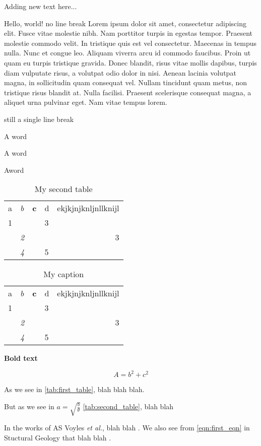 \documentclass[10pt,a4paper]{article}
\begin{document}
Adding new text here...

Hello, world!
no line break
Lorem ipsum dolor sit amet, consectetur adipiscing elit. Fusce vitae molestie nibh. Nam porttitor turpis in egestas tempor. Praesent molestie commodo velit. In tristique quis est vel consectetur. Maecenas in tempus \\nulla. Nunc et congue leo. Aliquam viverra arcu id commodo faucibus. Proin ut quam eu turpis tristique gravida. Donec blandit, risus vitae mollis dapibus, turpis diam vulputate risus, a volutpat odio dolor in nisi. Aenean lacinia volutpat magna, in sollicitudin quam consequat vel. Nullam tincidunt quam metus, non tristique risus blandit at. Nulla facilisi. Praesent scelerisque consequat magna, a aliquet urna pulvinar eget. Nam vitae tempus lorem.





still a single line break

A word

A             word

Aword


\begin{table}[]
\centering
\caption{My second table}
\label{tab:second_table}
\begin{tabular}{clllr}
a & \textit{b} & \textbf{c} & d & ekjkjnjknljnllknijl \\
1 & \textit{}  & \textbf{}  & 3 &                     \\
  & \textit{2} & \textbf{}  &   & 3                   \\
  & \textit{4} & \textbf{}  & 5 &                    
\end{tabular}
\end{table}


\begin{table}[]
\centering
\caption{My caption}
\label{tab:first_table}
\begin{tabular}{clllr}
a & \textit{b} & \textbf{c} & d & ekjkjnjknljnllknijl \\
1 & \textit{}  & \textbf{}  & 3 &                     \\
  & \textit{2} & \textbf{}  &   & 3                   \\
  & \textit{4} & \textbf{}  & 5 &                    
\end{tabular}
\end{table}



\textbf{Bold text}


\begin{equation}\label{eqn:first_eqn}
A = b^2  + c^2
\end{equation}



As we see in \autoref{tab:first_table}, blah blah blah.


But as we see in  $a = \sqrt{\frac{b}{\theta}}$ \autoref{tab:second_table}, blah blah

In the works of AS Voyles \emph{et al.}, blah blah  \cite{Voyles2017}.  We also see from \autoref{eqn:first_eqn} in Stuctural Geology that blah blah  \cite{dennis1972structural}.






\end{document}
